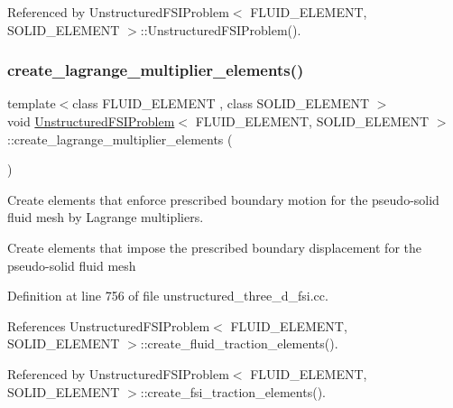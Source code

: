 Referenced by Unstructured\+F\+S\+I\+Problem$<$ F\+L\+U\+I\+D\+\_\+\+E\+L\+E\+M\+E\+N\+T, S\+O\+L\+I\+D\+\_\+\+E\+L\+E\+M\+E\+N\+T $>$\+::\+Unstructured\+F\+S\+I\+Problem().

\mbox{\label{classUnstructuredFSIProblem_a6f810c300f373cfc79e23d58f95944e3}} 
\subsubsection{\texorpdfstring{create\+\_\+lagrange\+\_\+multiplier\+\_\+elements()}{create\_lagrange\_multiplier\_elements()}}
{\footnotesize\ttfamily template$<$class F\+L\+U\+I\+D\+\_\+\+E\+L\+E\+M\+E\+NT , class S\+O\+L\+I\+D\+\_\+\+E\+L\+E\+M\+E\+NT $>$ \\
void \hyperlink{classUnstructuredFSIProblem}{Unstructured\+F\+S\+I\+Problem}$<$ F\+L\+U\+I\+D\+\_\+\+E\+L\+E\+M\+E\+NT, S\+O\+L\+I\+D\+\_\+\+E\+L\+E\+M\+E\+NT $>$\+::create\+\_\+lagrange\+\_\+multiplier\+\_\+elements (\begin{DoxyParamCaption}{ }\end{DoxyParamCaption})}



Create elements that enforce prescribed boundary motion for the pseudo-\/solid fluid mesh by Lagrange multipliers. 

Create elements that impose the prescribed boundary displacement for the pseudo-\/solid fluid mesh 

Definition at line 756 of file unstructured\+\_\+three\+\_\+d\+\_\+fsi.\+cc.



References Unstructured\+F\+S\+I\+Problem$<$ F\+L\+U\+I\+D\+\_\+\+E\+L\+E\+M\+E\+N\+T, S\+O\+L\+I\+D\+\_\+\+E\+L\+E\+M\+E\+N\+T $>$\+::create\+\_\+fluid\+\_\+traction\+\_\+elements().



Referenced by Unstructured\+F\+S\+I\+Problem$<$ F\+L\+U\+I\+D\+\_\+\+E\+L\+E\+M\+E\+N\+T, S\+O\+L\+I\+D\+\_\+\+E\+L\+E\+M\+E\+N\+T $>$\+::create\+\_\+fsi\+\_\+traction\+\_\+elements().

\mbox{\label{classUnstructuredFSIProblem_a90c15e131c5ef01add676e0e78e5628c}} 
